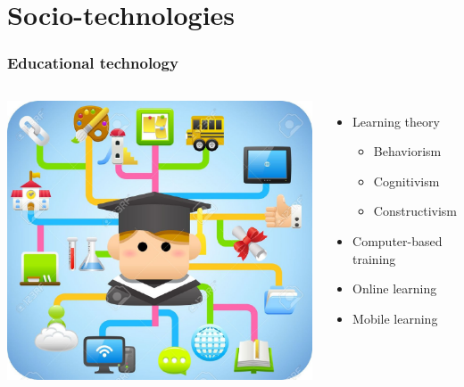 \documentclass{beamer}
\begin{document}
\section{Socio-technologies}
\begin{frame}
	\frametitle{Educational technology}
	\begin{columns}
		\includegraphics[scale=.5]{EdTech_main}
		\begin{itemize}
			\item Learning theory
				\begin{itemize}
					\item Behaviorism
					\item Cognitivism
					\item Constructivism
				\end{itemize}
			\item Computer-based training
			\item Online learning
			\item Mobile learning
		\end{itemize}
	\end{columns}
\end{frame}
\end{document}
